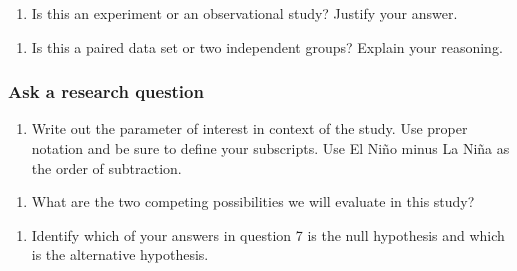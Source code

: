 \documentclass[
]{report}
\providecommand{\tightlist}{%
  \setlength{\itemsep}{0pt}\setlength{\parskip}{0pt}}
\newcommand\latexcode[1]{#1}
\begin{document}
\vspace{.6in}

\newpage

\begin{enumerate}
\def\labelenumi{\arabic{enumi}.}
\setcounter{enumi}{3}
\tightlist
\item
  Is this an experiment or an observational study? Justify your answer.
\end{enumerate}

\vspace{1in}

\begin{enumerate}
\def\labelenumi{\arabic{enumi}.}
\setcounter{enumi}{4}
\tightlist
\item
  Is this a paired data set or two independent groups? Explain your reasoning.
\end{enumerate}

\vspace{1in}

\hypertarget{ask-a-research-question-3}{%
\subsubsection*{Ask a research question}\label{ask-a-research-question-3}}

\begin{enumerate}
\def\labelenumi{\arabic{enumi}.}
\setcounter{enumi}{5}
\tightlist
\item
  Write out the parameter of interest in context of the study. Use proper notation and be sure to define your subscripts. Use El Ni\latexcode{\~{n}}o minus La Ni\latexcode{\~{n}}a as the order of subtraction.
\end{enumerate}

\vspace{1in}

\begin{enumerate}
\def\labelenumi{\arabic{enumi}.}
\setcounter{enumi}{6}
\tightlist
\item
  What are the two competing possibilities we will evaluate in this study?
\end{enumerate}

\vspace{1in}

\begin{enumerate}
\def\labelenumi{\arabic{enumi}.}
\setcounter{enumi}{7}
\tightlist
\item
  Identify which of your answers in question 7 is the null hypothesis and which is the alternative hypothesis.
\end{enumerate}
\end{document}
